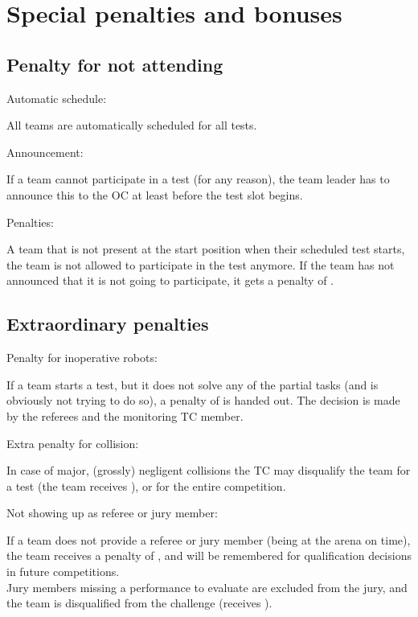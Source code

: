 \section{Special penalties and bonuses}\label{sec:special_awards}


\subsection{Penalty for not attending}\label{rule:not_attending}
\begin{enumerate}
{\bf\item Automatic schedule:} All teams are automatically scheduled for all tests.
{\bf\item Announcement:} If a team cannot participate in a test (for any reason),
the team leader has to announce this to the OC at least  before the test slot begins.
{\bf\item Penalties:} A team that is not present at the start position when their scheduled test starts, the team is not allowed to participate in the test anymore. If the team has not announced that it is not going to participate, it gets a penalty of . 
\end{enumerate}

\subsection{Extraordinary penalties}\label{rule:extraordinary_penalties}
\begin{enumerate}
{\bf\item Penalty for inoperative robots:} If a team starts a test, but it does not solve any of the partial tasks
(and is obviously not trying to do so), a penalty of  is handed out. 
The decision is made by the referees and the monitoring TC member.  
{\bf\item Extra penalty for collision:} In case of major, (grossly) negligent collisions the TC may disqualify the team for 
a test (the team receives ), or for the entire competition.
{\bf\item Not showing up as referee or jury member:}
If a team does not provide a referee or jury member (being at the arena on time), the team receives a penalty
of , and will be remembered for qualification decisions in future competitions.\\
Jury members missing a performance to evaluate are excluded from the jury, and the team is 
disqualified from the challenge (receives ).
\end{enumerate}

